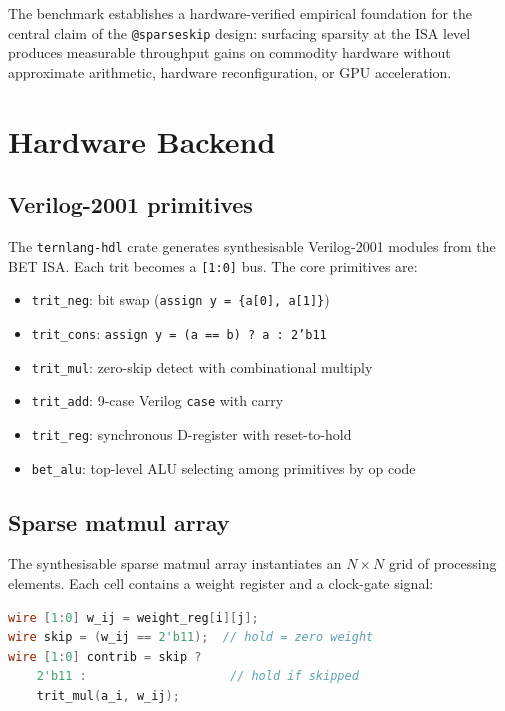 \documentclass[11pt,a4paper]{article}
\begin{document}
The benchmark establishes a hardware-verified empirical foundation for the
central claim of the \texttt{@sparseskip} design: surfacing sparsity at the
ISA level produces measurable throughput gains on commodity hardware without
approximate arithmetic, hardware reconfiguration, or GPU acceleration.

\section{Hardware Backend}
\label{sec:hdl}

\subsection{Verilog-2001 primitives}

The \texttt{ternlang-hdl} crate generates synthesisable Verilog-2001 modules
from the BET ISA. Each trit becomes a \texttt{[1:0]} bus. The core primitives
are:

\begin{itemize}
  \item \texttt{trit\_neg}: bit swap (\texttt{assign y = \{a[0], a[1]\}})
  \item \texttt{trit\_cons}: \texttt{assign y = (a == b) ? a : 2'b11}
  \item \texttt{trit\_mul}: zero-skip detect with combinational multiply
  \item \texttt{trit\_add}: 9-case Verilog \texttt{case} with carry
  \item \texttt{trit\_reg}: synchronous D-register with reset-to-hold
  \item \texttt{bet\_alu}: top-level ALU selecting among primitives by op code
\end{itemize}

\subsection{Sparse matmul array}

The synthesisable sparse matmul array instantiates an $N \times N$ grid of
processing elements. Each cell contains a weight register and a clock-gate
signal:

\begin{lstlisting}[language=Verilog,
  caption={Per-cell clock gating in sparse matmul}]
wire [1:0] w_ij = weight_reg[i][j];
wire skip = (w_ij == 2'b11);  // hold = zero weight
wire [1:0] contrib = skip ?
    2'b11 :                    // hold if skipped
    trit_mul(a_i, w_ij);
\end{lstlisting}
\end{document}
